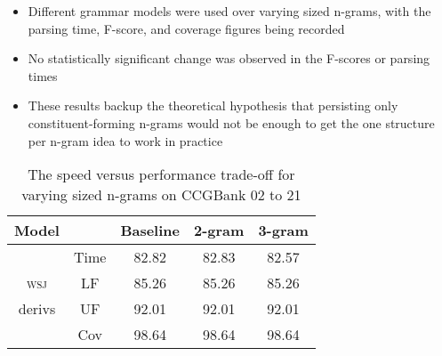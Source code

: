 \documentclass[portrait]{usydposter}
\newcommand{\acronym}[1]{\textsc{#1}\xspace}
\newcommand{\ngram}{n-gram\xspace}
\newcommand{\ngrams}{{\ngram}s\xspace}
\newcommand{\ccgbank}{CCGBank\xspace}
\newcommand{\np}{\acronym{np}}
\newcommand{\wsj}{\acronym{wsj}}
\begin{document}
\begin{multicols}{3}
\begin{itemize}
  \item Different grammar models were used over varying sized \ngrams, with the  parsing time, F-score, and coverage figures being recorded
  \item No statistically significant change was observed in the F-scores or parsing times
  \item These results backup the theoretical hypothesis that persisting only constituent-forming \ngrams would not be enough to get the one structure per \ngram idea to work in practice
\end{itemize}

\begin{table}
  \small
  \begin{tabular}{cc||c|cc}
    \hline
    Model & & Baseline & 2-gram & 3-gram \\
    \hline \hline
           &  Time  & 82.82   & 82.83   & 82.57  \\
    \wsj   &   LF   & 85.26   & 85.26   & 85.26  \\
    derivs &   UF   & 92.01   & 92.01   & 92.01  \\
           &   Cov  & 98.64   & 98.64   & 98.64  \\
    \hline
  \end{tabular}
  \caption{The speed versus performance trade-off for varying sized \ngrams on \ccgbank 02 to 21}
  \label{tab:results}
\end{table}


\end{multicols}
\end{document}
